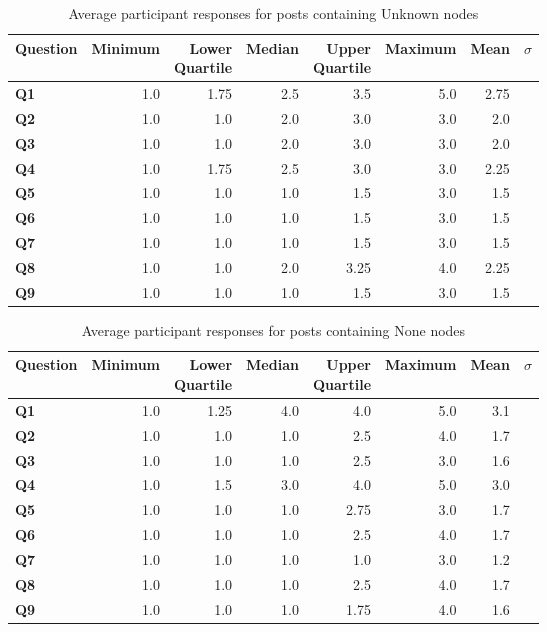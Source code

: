 \begin{table}
\centering
\caption{Average participant responses for posts containing Unknown nodes}
\label{table:perception:unknown-average}
\begin{tabular}{ l | r | r | r | r | r | r | r}
\textbf{Question} & \textbf{Minimum} & \pbox{2cm}{\textbf{Lower}\\ \textbf{Quartile}} & \textbf{Median} & \pbox{2cm}{\textbf{Upper}\\ \textbf{Quartile}} & \textbf{Maximum} & \textbf{Mean} & \textbf{$\sigma$}\\
\hline
\textbf{Q1} &  1.0 & 1.75 & 2.5 & 3.5 & 5.0 & 2.75 &  \\
\hline
\textbf{Q2} &  1.0 & 1.0 & 2.0 & 3.0 & 3.0 & 2.0 &  \\
\hline
\textbf{Q3} &  1.0 & 1.0 & 2.0 & 3.0 & 3.0 & 2.0 &  \\
\hline
\textbf{Q4} &  1.0 & 1.75 & 2.5 & 3.0 & 3.0 & 2.25 &  \\
\hline
\textbf{Q5} &  1.0 & 1.0 & 1.0 & 1.5 & 3.0 & 1.5 &  \\
\hline
\textbf{Q6} &  1.0 & 1.0 & 1.0 & 1.5 & 3.0 & 1.5 &  \\
\hline
\textbf{Q7} &  1.0 & 1.0 & 1.0 & 1.5 & 3.0 & 1.5 &  \\
\hline
\textbf{Q8} &  1.0 & 1.0 & 2.0 & 3.25 & 4.0 & 2.25 &  \\
\hline
\textbf{Q9} &  1.0 & 1.0 & 1.0 & 1.5 & 3.0 & 1.5 &  \\
\end{tabular}
\end{table}




\begin{table}
\centering
\caption{Average participant responses for posts containing None nodes}
\label{table:perception:none-average}
\begin{tabular}{ l | r | r | r | r | r | r | r}
\textbf{Question} & \textbf{Minimum} & \pbox{2cm}{\textbf{Lower}\\ \textbf{Quartile}} & \textbf{Median} & \pbox{2cm}{\textbf{Upper}\\ \textbf{Quartile}} & \textbf{Maximum} & \textbf{Mean} & \textbf{$\sigma$}\\
\hline
\textbf{Q1} &  1.0 & 1.25 & 4.0 & 4.0 & 5.0 & 3.1 &  \\
\hline
\textbf{Q2} &  1.0 & 1.0 & 1.0 & 2.5 & 4.0 & 1.7 &  \\
\hline
\textbf{Q3} &  1.0 & 1.0 & 1.0 & 2.5 & 3.0 & 1.6 &  \\
\hline
\textbf{Q4} &  1.0 & 1.5 & 3.0 & 4.0 & 5.0 & 3.0 &  \\
\hline
\textbf{Q5} &  1.0 & 1.0 & 1.0 & 2.75 & 3.0 & 1.7 &  \\
\hline
\textbf{Q6} &  1.0 & 1.0 & 1.0 & 2.5 & 4.0 & 1.7 &  \\
\hline
\textbf{Q7} &  1.0 & 1.0 & 1.0 & 1.0 & 3.0 & 1.2 &  \\
\hline
\textbf{Q8} &  1.0 & 1.0 & 1.0 & 2.5 & 4.0 & 1.7 &  \\
\hline
\textbf{Q9} &  1.0 & 1.0 & 1.0 & 1.75 & 4.0 & 1.6 &  \\
\end{tabular}
\end{table}
